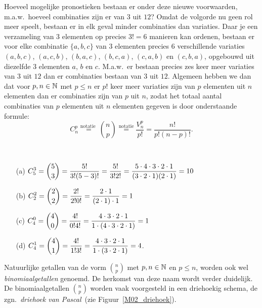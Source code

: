 \documentclass{ximera}
\begin{document}
Hoeveel mogelijke pronostieken bestaan er onder deze nieuwe
voorwaarden, m.a.w.~hoeveel combinaties zijn er van $3$ uit $12$?
Omdat de volgorde nu geen rol meer speelt, bestaan er in elk geval
minder combinaties dan variaties. Daar je een verzameling van $3$
elementen op precies $3!=6$ manieren kan ordenen, bestaan er voor
elke combinatie $\{a,b,c\}$ van $3$ elementen precies $6$
verschillende variaties $(a,b,c)$, $(a,c,b)$, $(b,a,c)$,
$(b,c,a)$, $(c,a,b)$ en $(c,b,a)$, opgebouwd uit diezelfde $3$
elementen $a$, $b$ en $c$. M.a.w.~er bestaan precies zes keer meer
variaties van $3$ uit $12$ dan er combinaties bestaan van $3$ uit
$12$. Algemeen hebben we dan dat voor $p,n\in\mathbb{N}$ met $p\leqslant
n$ er $p!$ keer meer variaties zijn van $p$ elementen uit $n$
elementen dan er combinaties zijn van $p$ uit $n$, zodat het
totaal aantal combinaties van $p$ elementen uit $n$ elementen
gegeven is door onderstaande formule:
\[C^p_n\overset{\textrm{notatie }}{=}{n\choose p}\overset{\textrm{notatie}}{=}\frac{V^p_n}{p!}=\frac{n!}{p!(n-p)!}.\]
\begin{example}\ \vspace{0ex}
\begin{enumerate}
\item[(a)] $\displaystyle{C^3_5={5\choose3}=\frac{5!}{3!(5-3)!}=\frac{5!}{3!2!}=\frac{5\cdot4\cdot3\cdot2\cdot1}{(3\cdot2\cdot1)(2\cdot1)}=10}$
\item[(b)] $\displaystyle{C^2_2={2\choose2}=\frac{2!}{2!0!}=\frac{2\cdot1}{(2\cdot1)\cdot1}=1}$
\item[(c)] $\displaystyle{C^0_4={4\choose0}=\frac{4!}{0!4!}=\frac{4\cdot3\cdot2\cdot1}{1\cdot(4\cdot3\cdot2\cdot1)}=1}$
\item[(d)]
$\displaystyle{C^1_4={4\choose1}=\frac{4!}{1!3!}=\frac{4\cdot3\cdot2\cdot1}{1\cdot(3\cdot2\cdot1)}=4}$.
\end{enumerate}
\end{example}

Natuurlijke getallen van de vorm ${n\choose p}$ met $p,n\in\mathbb{N}$ en
$p\leqslant n$, worden ook wel \emph{binomiaalgetallen} genoemd.
De herkomst van deze naam wordt verder duidelijk. De
binomiaalgetallen ${n\choose p}$ worden vaak voorgesteld in een
driehoekig schema, de zgn.~\emph{driehoek van
Pascal}\footnotemark\ (zie Figuur~\ref{M02_driehoek}).
\end{document}
